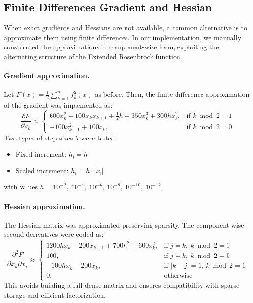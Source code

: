 \documentclass[a4paper,12pt]{article}
\begin{document}
	\subsection{Finite Differences Gradient and Hessian}
	
	When exact gradients and Hessians are not available, a common alternative is to approximate them using finite differences. In our implementation, we manually constructed the approximations in component-wise form, exploiting the alternating structure of the Extended Rosenbrock function.
	
	\paragraph{Gradient approximation.}
	Let \( F(x) = \frac{1}{2} \sum_{k=1}^n f_k^2(x) \) as before. Then, the finite-difference approximation of the gradient was implemented as:
	\[
	\frac{\partial F}{\partial x_k} \approx 
	\begin{cases}
		600x_k^2 - 100x_k x_{k+1} + \frac{1}{2}h + 350x_k^3 + 300hx_k^2, & \text{if } k \bmod 2 = 1 \\
		-100x_{k-1}^2 + 100x_k, & \text{if } k \bmod 2 = 0
	\end{cases}
	\]
	Two types of step sizes \( h \) were tested:
	\begin{itemize}[nosep]
		\item Fixed increment: \( h_i = h \)
		\item Scaled increment: \( h_i = h \cdot |x_i| \)
	\end{itemize}
	with values \( h = 10^{-2},\ 10^{-4},\ 10^{-6},\ 10^{-8},\ 10^{-10},\ 10^{-12} \).
	
	\paragraph{Hessian approximation.}
	The Hessian matrix was approximated preserving sparsity. The component-wise second derivatives were coded as:
	\[
	\frac{\partial^2 F}{\partial x_k \partial x_j} \approx
	\begin{cases}
		1200hx_k - 200x_{k+1} + 700h^2 + 600x_k^2, & \text{if } j = k,\ k \bmod 2 = 1 \\
		100, & \text{if } j = k,\ k \bmod 2 = 0 \\
		-100hx_k - 200x_k, & \text{if } |k - j| = 1,\ k \bmod 2 = 1 \\
		0, & \text{otherwise}
	\end{cases}
	\]
	This avoids building a full dense matrix and ensures compatibility with sparse storage and efficient factorization.
	\newpage
\end{document}
